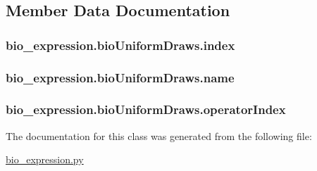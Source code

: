 \subsection{Member Data Documentation}
\hypertarget{classbio__expression_1_1bio_uniform_draws_abd25acf45bf3ce1538f5b9db2c8846cf}{
\subsubsection[{index}]{\setlength{\rightskip}{0pt plus 5cm}bio\+\_\+expression.\+bio\+Uniform\+Draws.\+index}}\label{classbio__expression_1_1bio_uniform_draws_abd25acf45bf3ce1538f5b9db2c8846cf}
\hypertarget{classbio__expression_1_1bio_uniform_draws_aeefe9e06713e94d4452737ffaae08b6b}{
\subsubsection[{name}]{\setlength{\rightskip}{0pt plus 5cm}bio\+\_\+expression.\+bio\+Uniform\+Draws.\+name}}\label{classbio__expression_1_1bio_uniform_draws_aeefe9e06713e94d4452737ffaae08b6b}
\hypertarget{classbio__expression_1_1bio_uniform_draws_ac4174426e493fe9f054e548d8093c841}{
\subsubsection[{operator\+Index}]{\setlength{\rightskip}{0pt plus 5cm}bio\+\_\+expression.\+bio\+Uniform\+Draws.\+operator\+Index}}\label{classbio__expression_1_1bio_uniform_draws_ac4174426e493fe9f054e548d8093c841}


The documentation for this class was generated from the following file\+:\begin{DoxyCompactItemize}
\item 
\hyperlink{bio__expression_8py}{bio\+\_\+expression.\+py}\end{DoxyCompactItemize}
